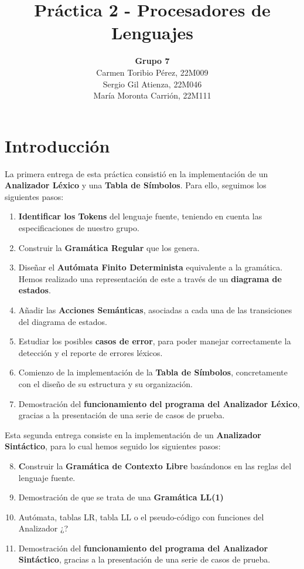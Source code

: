 \documentclass{article}
\title{\textbf{Práctica 2 - Procesadores de Lenguajes}}
\author{\textbf{Grupo 7}\\Carmen Toribio Pérez, 22M009\\Sergio Gil Atienza, 22M046\\María Moronta Carrión, 22M111}
\date{}
\begin{document}
\maketitle

\section*{Introducción}

La primera entrega de esta práctica consistió en la implementación de un \textbf{Analizador Léxico} y una \textbf{Tabla de Símbolos}. Para ello, seguimos los siguientes pasos: 
\begin{enumerate}
    \item \textbf{Identificar los Tokens} del lenguaje fuente, teniendo en cuenta las especificaciones de nuestro grupo.
    \item Construir la \textbf{Gramática Regular} que los genera.
    \item Diseñar el \textbf{Autómata Finito Determinista} equivalente a la gramática. Hemos realizado una representación de este a través de un \textbf{diagrama de estados}.
    \item Añadir las \textbf{Acciones Semánticas}, asociadas a cada una de las transiciones del diagrama de estados.
    \item Estudiar los posibles \textbf{casos de error}, para poder manejar correctamente la detección y el reporte de errores léxicos. 
    \item Comienzo de la implementación de la \textbf{Tabla de Símbolos}, concretamente con el diseño de su estructura y su organización.
    \item Demostración del \textbf{funcionamiento del programa del Analizador Léxico}, gracias a la presentación de una serie de casos de prueba.
\end{enumerate}
 
Esta segunda entrega consiste en la implementación de un \textbf{Analizador Sintáctico}, para lo cual hemos seguido los siguientes pasos:

\begin{enumerate}
    \setcounter{enumi}{7}
    \item \textbf Construir la \textbf{Gramática de Contexto Libre} basándonos en las reglas del lenguaje fuente.
    \item Demostración de que se trata de una \textbf{Gramática LL(1)}
    \item Autómata, tablas LR, tabla LL o el pseudo-código con funciones del Analizador ¿?
    \item Demostración del \textbf{funcionamiento del programa del Analizador Sintáctico}, gracias a la presentación de una serie de casos de prueba.
\end{enumerate}
\end{document}
